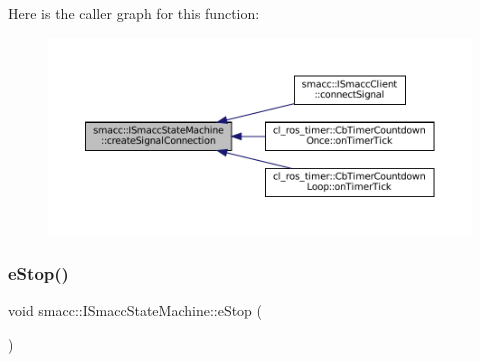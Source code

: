 Here is the caller graph for this function\+:
\nopagebreak
\begin{figure}[H]
\begin{center}
\leavevmode
\includegraphics[width=350pt]{classsmacc_1_1ISmaccStateMachine_adf0f42ade0c65cc471960fe2a7c42da2_icgraph}
\end{center}
\end{figure}
\mbox{\label{classsmacc_1_1ISmaccStateMachine_a66a2900be8629748dab7a5c5ab6ae94e}} 
\subsubsection{\texorpdfstring{e\+Stop()}{eStop()}}
{\footnotesize\ttfamily void smacc\+::\+I\+Smacc\+State\+Machine\+::e\+Stop (\begin{DoxyParamCaption}{ }\end{DoxyParamCaption})\hspace{0.3cm}{\ttfamily [virtual]}}



